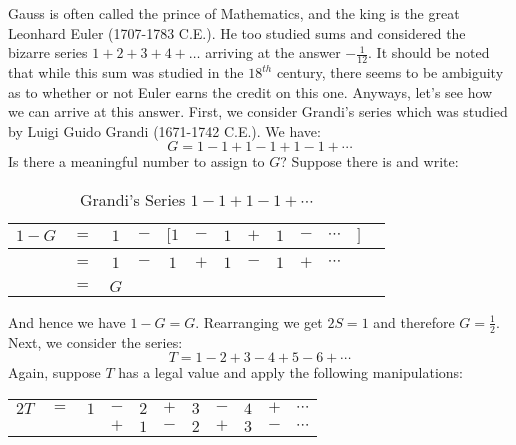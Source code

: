    \begin{example}
        \label{ex:Logic_Euler_Sum}%
        Gauss is often called the prince of Mathematics, and the king is the
        great Leonhard Euler (1707-1783 C.E.). He too
        studied sums and considered the bizarre series $1+2+3+4+\dots$ arriving
        at the answer $\minus\frac{1}{12}$. It should be noted that while this
        sum was studied in the $18^{th}$ century, there seems to be ambiguity as
        to whether or not Euler earns the credit on this one. Anyways, let's
        see how we can arrive at this answer. First, we consider
        Grandi's series which was studied by
        Luigi Guido Grandi (1671-1742 C.E.). We have:
        \begin{equation}
            G=1-1+1-1+1-1+\cdots
        \end{equation}
        Is there a meaningful number to assign to $G$? Suppose there is and
        write:
        \begin{table}[H]
            \centering
            \captionsetup{type=table}
            \begin{tabular}{ccccccccccccc}
                $1-G$&$=$&$1$&$-$&$\Big[$$1$&$-$&$1$&$+$&$1$&$-$&$\cdots$
                    &$\Big]$\\[1ex]
                \hline\\
                    &$=$&$1$&$-$&$1$&$+$&$1$&$-$&$1$&$+$&$\cdots$\\[1ex]
                \hline\\
                &$=$&$G$
            \end{tabular}
            \caption{Grandi's Series $1-1+1-1+\cdots$}
        \end{table}
        And hence we have $1-G=G$. Rearranging we get $2S=1$ and therefore
        $G=\frac{1}{2}$. Next, we consider the series:
        \begin{equation}
            T=1-2+3-4+5-6+\cdots
        \end{equation}
        Again, suppose $T$ has a legal value and apply the following
        manipulations:
        \begin{table}[H]
            \centering
            \captionsetup{type=table}
            \begin{tabular}{ccccccccccc}
                $2T$&$=$&$1$&$-$&$2$&$+$&$3$&$-$&$4$&$+$&$\cdots$\\
                    &   &   &$+$&$1$&$-$&$2$&$+$&$3$&$-$&$\cdots$\\

\end{tabular}
\end{table}
\end{example}
